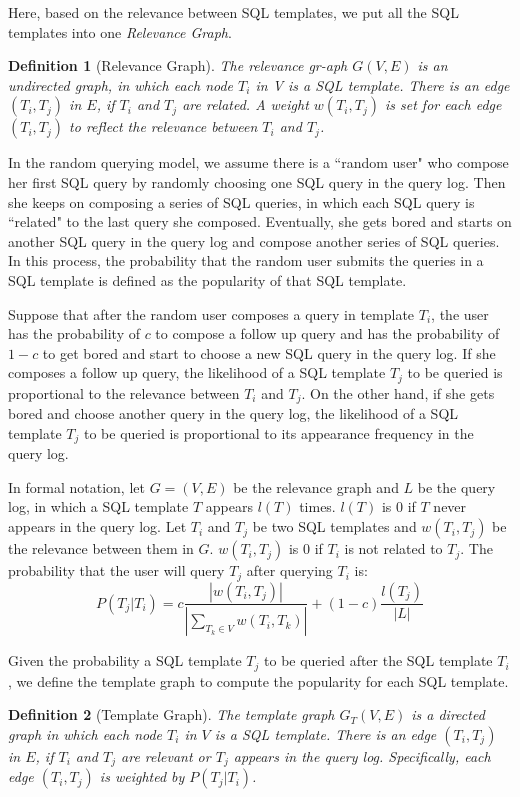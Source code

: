 \documentclass{vldb}
\newtheorem{definition}{Definition}
\begin{document}
Here, based on the relevance between SQL templates, we put all the SQL templates into one \emph{Relevance Graph}.  
\begin{definition}[Relevance Graph]
The relevance gr-aph $G(V, E)$ is an undirected graph, in which each node $T_i$ in V is a SQL template.  There is an edge $(T_i, T_j)$ in $E$, if $T_i$ and $T_j$ are related.  A weight $w(T_i, T_j)$ is set for each edge $(T_i, T_j)$ to reflect the relevance between $T_i$ and $T_j$. 
\end{definition}

In the random querying model, we assume there is a ``random user" who compose her first SQL query by randomly choosing one SQL query in the query log.  Then she keeps on composing a series of SQL queries, in which each SQL query is ``related" to the last query she composed.  Eventually, she gets bored and starts on another SQL query in the query log and compose another series of SQL queries.  In this process, the probability that the random user submits the queries in a SQL template is defined as the popularity of that SQL template. 

Suppose that after the random user composes a query in template $T_i$, the user has the probability of $c$ to compose a follow up query and has the probability of $1-c$ to get bored and start to choose a new SQL query in the query log.  If she composes a follow up query, the likelihood of a SQL template $T_j$ to be queried is proportional to the relevance between $T_i$ and $T_j$.  On the other hand, if she gets bored and choose another query in the query log, the likelihood of a SQL template $T_j$ to be queried is proportional to its appearance frequency in the query log.  

In formal notation, let $G = (V, E)$ be the relevance graph and $L$ be the query log, in which a SQL template $T$ appears $l(T)$ times.  $l(T)$ is 0 if $T$ never appears in the query log.  Let $T_i$ and $T_j$ be two SQL templates and $w(T_i, T_j)$ be the relevance between them in $G$.  $w(T_i, T_j)$ is 0 if $T_i$ is not related to $T_j$.  The probability that the user will query $T_j$ after querying $T_i$ is: 
\begin{displaymath}
P(T_j|T_i) = c\frac{|w(T_i, T_j)|}{|\sum_{T_k \in V}w(T_i, T_k)|} + (1-c)\frac{l(T_j)}{|L|}
\end{displaymath}

Given the probability a SQL template $T_j$ to be queried after the SQL template $T_i$, we define the template graph to compute the popularity for each SQL template.  
\begin{definition}[Template Graph]
The template graph $G_T(V, E)$ is a directed graph in which each node $T_i$ in $V$ is a SQL template.  There is an edge $(T_i, T_j)$ in $E$, if $T_i$ and $T_j$ are relevant or $T_j$ appears in the query log.  Specifically, each edge $(T_i, T_j)$ is weighted by $P(T_j|T_i)$.  
\end{definition}
\end{document}
